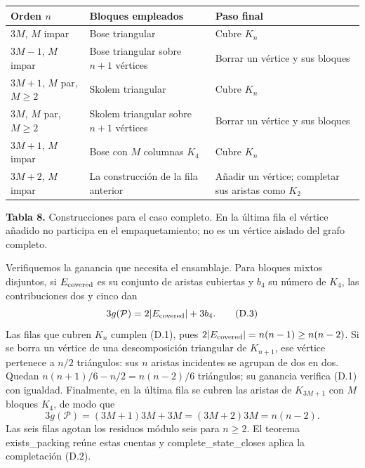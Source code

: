 \documentclass[spanish,11pt,a4paper]{article}
\newcounter{none}
\begin{document}
{\def\LTcaptype{none} %
\begin{longtable}[c]{@{}
  >{\raggedright\arraybackslash}p{}
  >{\raggedright\arraybackslash}p{}
  >{\raggedright\arraybackslash}p{}@{}}
\toprule\noalign{}
\begin{minipage}[b]{\linewidth}\raggedright
Orden \(n\)
\end{minipage} & \begin{minipage}[b]{\linewidth}\raggedright
Bloques empleados
\end{minipage} & \begin{minipage}[b]{\linewidth}\raggedright
Paso final
\end{minipage} \\
\midrule\noalign{}
\endhead
\bottomrule\noalign{}
\endlastfoot
\(3M\), \(M\) impar & Bose triangular & Cubre \(K_n\) \\
\(3M-1\), \(M\) impar & Bose triangular sobre \(n+1\) vértices & Borrar un vértice y sus bloques \\
\(3M+1\), \(M\) par, \(M\ge2\) & Skolem triangular & Cubre \(K_n\) \\
\(3M\), \(M\) par, \(M\ge2\) & Skolem triangular sobre \(n+1\) vértices & Borrar un vértice y sus bloques \\
\(3M+1\), \(M\) impar & Bose con \(M\) columnas \(K_4\) & Cubre \(K_n\) \\
\(3M+2\), \(M\) impar & La construcción de la fila anterior & Añadir un vértice; completar sus aristas como \(K_2\) \\
\end{longtable}
}

\textbf{Tabla 8.} Construcciones para el caso completo. En la última fila el vértice añadido no participa en el empaquetamiento; no es un vértice aislado del grafo completo.

Verifiquemos la ganancia que necesita el ensamblaje. Para bloques mixtos disjuntos, si \(E_{\rm covered}\) es su conjunto de aristas cubiertas y \(b_4\) su número de \(K_4\), las contribuciones dos y cinco dan \[
3g(\mathcal P)=2|E_{\rm covered}|+3b_4.
\tag{D.3}
\] Las filas que cubren \(K_n\) cumplen (D.1), pues \(2|E_{\rm covered}|=n(n-1)\ge n(n-2)\). Si se borra un vértice de una descomposición triangular de \(K_{n+1}\), ese vértice pertenece a \(n/2\) triángulos: sus \(n\) aristas incidentes se agrupan de dos en dos. Quedan \(n(n+1)/6-n/2=n(n-2)/6\) triángulos; su ganancia verifica (D.1) con igualdad. Finalmente, en la última fila se cubren las aristas de \(K_{3M+1}\) con \(M\) bloques \(K_4\), de modo que \[
3g(\mathcal P)=(3M+1)3M+3M=(3M+2)3M=n(n-2).
\tag{D.4}
\] Las seis filas agotan los residuos módulo seis para \(n\ge2\). El teorema {\ttfamily\small exists\_\discretionary{\hbox{\ensuremath{\hookrightarrow}}}{}{}packing} reúne estas cuentas y {\ttfamily\small complete\_\discretionary{\hbox{\ensuremath{\hookrightarrow}}}{}{}state\_\discretionary{\hbox{\ensuremath{\hookrightarrow}}}{}{}closes} aplica la completación (D.2).
\end{document}
